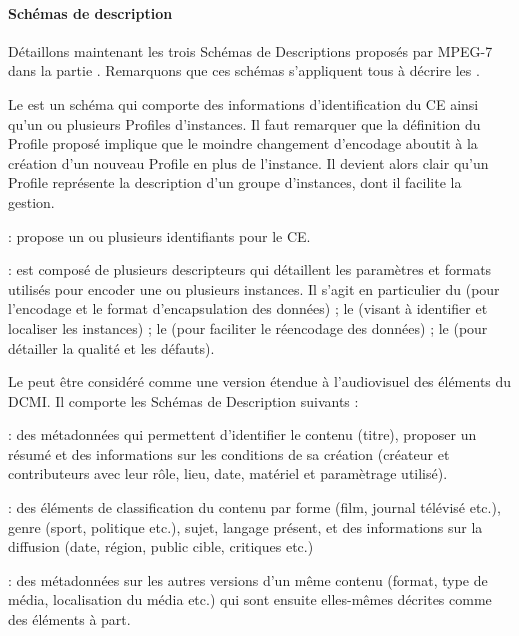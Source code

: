 \paragraph{Schémas de description}
Détaillons maintenant les trois Schémas de Descriptions proposés par MPEG-7 dans la partie .
Remarquons que ces schémas s'appliquent tous à décrire les .

Le  est un schéma qui comporte des informations d'identification du CE ainsi qu'un ou plusieurs Profiles d'instances. 
Il faut remarquer que la définition du Profile proposé implique que le moindre changement d'encodage aboutit à la création d'un nouveau Profile en plus de l'instance. 
Il devient alors clair qu'un Profile représente la description d'un groupe d'instances, dont il facilite la gestion.
\begin{liste}
	\item {} : propose un ou plusieurs identifiants pour le CE.
	\item {} : est composé de plusieurs descripteurs qui détaillent les paramètres et formats utilisés pour encoder une ou plusieurs instances.
	Il s'agit en particulier du  (pour l'encodage et le format d'encapsulation des données) ; le  (visant à identifier et localiser les instances) ; le  (pour faciliter le réencodage des données) ; le  (pour détailler la qualité et les défauts). 
\end{liste}


Le  peut être considéré comme une version étendue à l'audiovisuel des éléments du DCMI. Il comporte les Schémas de Description suivants : 
	\begin{liste}
		\item {} : des métadonnées qui permettent d'identifier le contenu (titre), proposer un résumé et des informations sur les conditions de sa création (créateur et contributeurs avec leur rôle, lieu, date, matériel et paramètrage utilisé).

		\item {} : des éléments de classification du contenu par forme (film, journal télévisé etc.), genre (sport, politique etc.), sujet, langage présent, et des informations sur la diffusion (date, région, public cible, critiques etc.)

		\item {} : des métadonnées sur les autres versions d'un même contenu (format, type de média, localisation du média etc.) qui sont ensuite elles-mêmes décrites comme des éléments à part.
	\end{liste}

